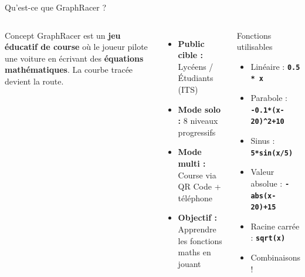 \documentclass[aspectratio=169,12pt]{beamer}
\newcommand{\tech}[1]{\textcolor{mycyan}{\textbf{\texttt{#1}}}}
\newcommand{\highlight}[1]{\textcolor{myyellow}{\textbf{#1}}}
\begin{document}
\begin{frame}{Qu'est-ce que GraphRacer ?}
  \begin{columns}
    \begin{block}{Concept}
      GraphRacer est un \highlight{jeu \'educatif de course} o\`u le joueur pilote
      une voiture en \'ecrivant des \textbf{\'equations math\'ematiques}.
      La courbe trac\'ee devient la route.
    \end{block}
    \vspace{0.4cm}
    \begin{itemize}
      \item \textbf{Public cible :} Lyc\'eens / \'Etudiants (ITS)
      \item \textbf{Mode solo :} 8 niveaux progressifs
      \item \textbf{Mode multi :} Course via QR Code + t\'el\'ephone
      \item \textbf{Objectif :} Apprendre les fonctions maths en jouant
    \end{itemize}
    \begin{exampleblock}{Fonctions utilisables}
      \begin{itemize}
        \item Lin\'eaire : \tech{0.5 * x}
        \item Parabole : \tech{-0.1*(x-20)\^{}2+10}
        \item Sinus : \tech{5*sin(x/5)}
        \item Valeur absolue : \tech{-abs(x-20)+15}
        \item Racine carr\'ee : \tech{sqrt(x)}
        \item Combinaisons !
      \end{itemize}
    \end{exampleblock}
  \end{columns}
\end{frame}
\end{document}
